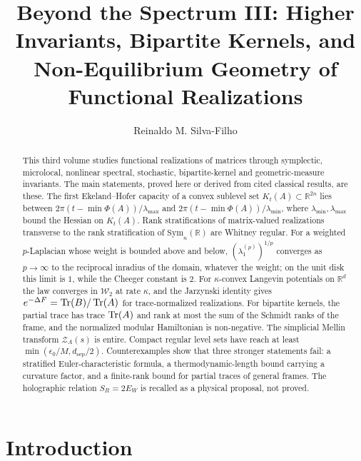 \documentclass[11pt,a4paper,reqno]{amsart}
\title[Beyond the Spectrum III]{Beyond the Spectrum III: Higher Invariants, Bipartite Kernels, and Non-Equilibrium Geometry of Functional Realizations}
\author{Reinaldo M. Silva-Filho}
\date{}
\theoremstyle{definition}
\theoremstyle{remark}
\numberwithin{equation}{section}
\begin{document}
\begin{abstract}
This third volume studies functional realizations of matrices through symplectic, microlocal, nonlinear spectral, stochastic, bipartite-kernel and geometric-measure invariants. The main statements, proved here or derived from cited classical results, are these. The first Ekeland--Hofer capacity of a convex sublevel set $K_t(A)\subset\mathbb{R}^{2n}$ lies between $2\pi(t-\min\Phi(A))/\lambda_{\max}$ and $2\pi(t-\min\Phi(A))/\lambda_{\min}$, where $\lambda_{\min},\lambda_{\max}$ bound the Hessian on $K_t(A)$. Rank stratifications of matrix-valued realizations transverse to the rank stratification of $\mathrm{Sym}_n(\mathbb{R})$ are Whitney regular. For a weighted $p$-Laplacian whose weight is bounded above and below, $(\lambda_1^{(p)})^{1/p}$ converges as $p\to\infty$ to the reciprocal inradius of the domain, whatever the weight; on the unit disk this limit is $1$, while the Cheeger constant is $2$. For $\kappa$-convex Langevin potentials on $\mathbb{R}^d$ the law converges in $\mathcal{W}_2$ at rate $\kappa$, and the Jarzynski identity gives $e^{-\Delta F}=\Tr(B)/\Tr(A)$ for trace-normalized realizations. For bipartite kernels, the partial trace has trace $\Tr(A)$ and rank at most the sum of the Schmidt ranks of the frame, and the normalized modular Hamiltonian is non-negative. The simplicial Mellin transform $\mathcal{Z}_A(s)$ is entire. Compact regular level sets have reach at least $\min(\epsilon_0/M, d_{\mathrm{sep}}/2)$. Counterexamples show that three stronger statements fail: a stratified Euler-characteristic formula, a thermodynamic-length bound carrying a curvature factor, and a finite-rank bound for partial traces of general frames. The holographic relation $S_R=2E_W$ is recalled as a physical proposal, not proved.
\end{abstract}

\maketitle
\tableofcontents

\section{Introduction}
\label{sec:intro}
\end{document}
